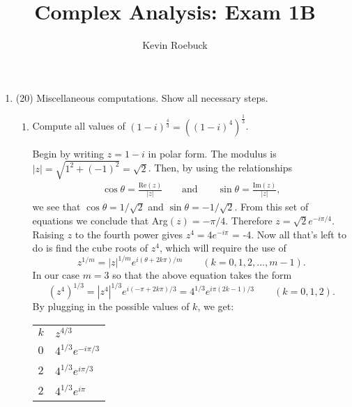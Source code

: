 \documentclass[11pt]{article}
\begin{document}
\title{Complex Analysis: Exam 1B}
\author{Kevin Roebuck}
\maketitle

\begin{enumerate}
\item (20) Miscellaneous computations. Show all necessary steps.
  \begin{enumerate}
  \item Compute all values of $(1 - i)^{\frac{4}{3}} = ((1 - i)^4)^{\frac{1}{3}}$.

  \begin{mdframed}[align=left]
    Begin by writing $z = 1 - i$ in polar form. The modulus is $|z| = \sqrt{1^2 + (-1)^2} = \sqrt{2}$. Then, by using the relationships
    \begin{align*}
      \cos\theta = \frac{\text{Re}(z)}{|z|} \qquad \text{and} \qquad \sin\theta = \frac{\text{Im}(z)}{|z|},
    \end{align*}
    we see that $\cos\theta = 1/\sqrt{2}$ and $\sin\theta = -1/\sqrt{2}$. From this set of equations we conclude that Arg$(z) = -\pi/4$. Therefore $z = \sqrt{2}e^{-i\pi/4}$. Raising $z$ to the fourth power gives $z^4 = 4e^{-i\pi}$ = -4. Now all that's left to do is find the cube roots of $z^4$, which will require the use of
    \begin{equation*}
      z^{1/m} = |z|^{1/m}e^{i(\theta + 2k\pi)/m} \qquad (k = 0,1,2,...,m-1).
    \end{equation*}
    In our case $m = 3$ so that the above equation takes the form
    \begin{equation*}
      (z^4)^{1/3} = \left|z^4\right|^{1/3}e^{i(-\pi + 2k\pi)/3}
      = 4^{1/3}e^{i\pi(2k - 1)/3}
      \qquad (k = 0,1,2).
    \end{equation*}
    By plugging in the possible values of $k$, we get:

    \begin{center}
    \begin{tabular}{|l|l|}\hline
      $k$ & $z^{4/3}$ \\\Xhline{2\arrayrulewidth}
      0 & $4^{1/3}e^{-i\pi/3}$ \\\hline
      2 & $4^{1/3}e^{i\pi/3}$ \\\hline
      2 & $4^{1/3}e^{i\pi}$ \\\hline
    \end{tabular}
    \end{center}


\end{mdframed}
\end{enumerate}
\end{enumerate}
\end{document}
